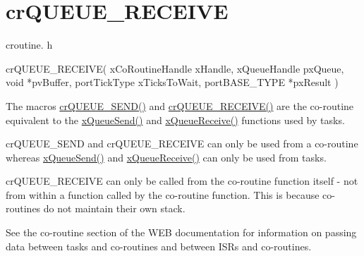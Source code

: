 \hypertarget{group__crQUEUE__RECEIVE}{}\section{cr\+Q\+U\+E\+U\+E\+\_\+\+R\+E\+C\+E\+I\+VE}
\label{group__crQUEUE__RECEIVE}
croutine. h 
\begin{DoxyPre}
 crQUEUE\_RECEIVE(
                    xCoRoutineHandle xHandle,
                    xQueueHandle pxQueue,
                    void *pvBuffer,
                    portTickType xTicksToWait,
                    portBASE\_TYPE *pxResult
                )\end{DoxyPre}


The macro\textquotesingle{}s \hyperlink{croutine_8h_a26af3d36f22a04168eebdf5b08465d6e}{cr\+Q\+U\+E\+U\+E\+\_\+\+S\+E\+N\+D()} and \hyperlink{croutine_8h_a586d57fd9a3e2aa5ae66484ed3be36c9}{cr\+Q\+U\+E\+U\+E\+\_\+\+R\+E\+C\+E\+I\+V\+E()} are the co-\/routine equivalent to the \hyperlink{queue_8h_af7eb49d3249351176992950d9185abe9}{x\+Queue\+Send()} and \hyperlink{queue_8h_af1549eac0e7f05694a59a0b967c80be3}{x\+Queue\+Receive()} functions used by tasks.

cr\+Q\+U\+E\+U\+E\+\_\+\+S\+E\+ND and cr\+Q\+U\+E\+U\+E\+\_\+\+R\+E\+C\+E\+I\+VE can only be used from a co-\/routine whereas \hyperlink{queue_8h_af7eb49d3249351176992950d9185abe9}{x\+Queue\+Send()} and \hyperlink{queue_8h_af1549eac0e7f05694a59a0b967c80be3}{x\+Queue\+Receive()} can only be used from tasks.

cr\+Q\+U\+E\+U\+E\+\_\+\+R\+E\+C\+E\+I\+VE can only be called from the co-\/routine function itself -\/ not from within a function called by the co-\/routine function. This is because co-\/routines do not maintain their own stack.

See the co-\/routine section of the W\+EB documentation for information on passing data between tasks and co-\/routines and between I\+SR\textquotesingle{}s and co-\/routines.



